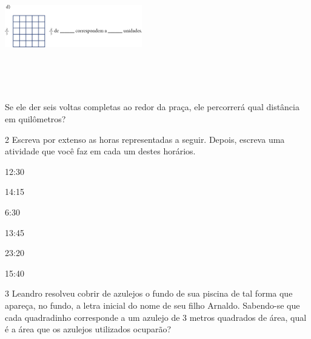 \begin{mdframed}[linewidth=2pt,linecolor=salmao,roundcorner=2pt]
\includegraphics[width=2.35256in,height=2.20730in]{media/image61.png}

Se ele der seis voltas completas ao redor da praça, ele percorrerá qual
distância em quilômetros?

\begin{mdframed}[linewidth=2pt,linecolor=salmao,roundcorner=2pt]

\end{mdframed}


\num{2} Escreva por extenso as horas representadas a seguir. Depois, escreva uma atividade que você faz em cada um destes horários.

\begin{escolha}
  \item 12:30

  \item 14:15

  \item 6:30

  \item 13:45

  \item 23:20

  \item 15:40
\end{escolha}

\num{3} Leandro resolveu cobrir de azulejos o fundo de sua piscina de tal forma
que apareça, no fundo, a letra inicial do nome de seu filho Arnaldo.
Sabendo-se que cada quadradinho corresponde a um azulejo de 3 metros
quadrados de área, qual é a área que os azulejos utilizados
ocuparão?


\end{mdframed}
